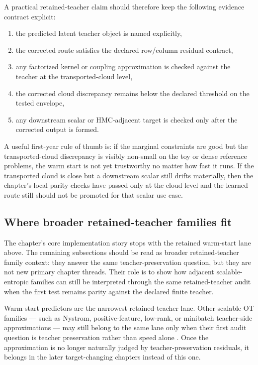 A practical retained-teacher claim should therefore keep the following evidence
contract explicit:
\begin{enumerate}[label=(\arabic*)]
  \item the predicted latent teacher object is named explicitly,
  \item the corrected route satisfies the declared row/column residual contract,
  \item any factorized kernel or coupling approximation is checked against the
    teacher at the transported-cloud level,
  \item the corrected cloud discrepancy remains below the declared threshold on the
    tested envelope,
  \item any downstream scalar or HMC-adjacent target is checked only after the
    corrected output is formed.
\end{enumerate}
A useful first-year rule of thumb is: if the marginal constraints are good but the
transported-cloud discrepancy is visibly non-small on the toy or dense reference
problems, the warm start is not yet trustworthy no matter how fast it runs.  If the
transported cloud is close but a downstream scalar still drifts materially, then the
chapter's local parity checks have passed only at the cloud level and the learned
route still should not be promoted for that scalar use case.

\subsection{Where broader retained-teacher families fit}
\label{sec:bf-learned-ot-retained-family}

The chapter's core implementation story stops with the retained warm-start lane
above.  The remaining subsections should be read as broader retained-teacher family
context: they answer the same teacher-preservation question, but they are not new
primary chapter threads.  Their role is to show how adjacent scalable-entropic
families can still be interpreted through the same retained-teacher audit when the
first test remains parity against the declared finite teacher.

Warm-start predictors are the narrowest retained-teacher lane.  Other scalable
OT families --- such as Nystrom, positive-feature, low-rank, or minibatch
teacher-side approximations --- may still belong to the same lane only when
their first audit question is teacher preservation rather than speed alone
\citep{altschuler2019nystrom,scetbon2020positivefeatures,forrow2019factored,scetbon2021lowrank,scetbon2022lowrank,genevay2016stochastic,genevay2018samplecomplexity,nguyen2022bomb,nguyen2021partialminibatch}.
Once the approximation is no longer naturally judged by teacher-preservation
residuals, it belongs in the later target-changing chapters instead of this one.

